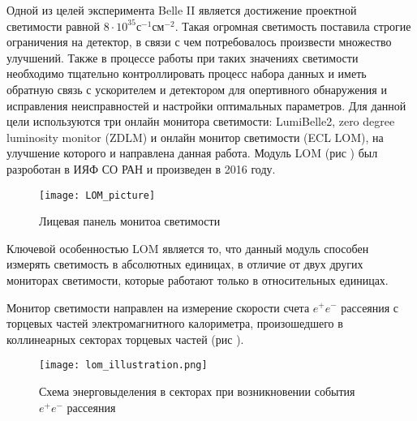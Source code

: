   Одной из целей эксперимента Belle II является достижение проектной светимости равной $8\cdot10^{35}$с$^{-1}$см$^{-2}$. Такая огромная светимость поставила строгие ограничения на детектор, в связи с чем потребовалось произвести множество улучшений. Также в процессе работы при таких значениях светимости необходимо тщательно контроллировать процесс набора данных и иметь обратную связь с ускорителем и детектором для опертивного обнаружения и исправления неисправностей и  настройки оптимальных параметров. Для данной цели используются три онлайн монитора светимости: LumiBelle2, zero degree luminosity monitor (ZDLM) и онлайн монитор светимости (ECL LOM), на улучшение которого и направлена данная работа. Модуль LOM (рис ) был разроботан в ИЯФ СО РАН и произведен в 2016 году. 
\begin{figure}[htp]
  \centering
  \texttt{[image: LOM\_picture]}
  \caption{Лицевая панель монитоа светимости}
  \label{fig:galaxy}
\end{figure}
Ключевой особенностью LOM является то, что данный модуль способен измерять светимость в абсолютных единицах, в отличие от двух других мониторах светимости, которые работают только в относительных единицах.\par 
  Монитор светимости направлен на измерение скорости счета $e^+e^-$ рассеяния с торцевых частей электромагнитного калориметра, произошедшего в коллинеарных секторах торцевых частей (рис ).
\begin{figure}[htp]
  \centering
  \texttt{[image: lom\_illustration.png]}
  \caption{Схема энерговыделения в секторах при возникновении события $e^+e^-$ рассеяния}
  \label{fig:galaxy}
\end{figure}
